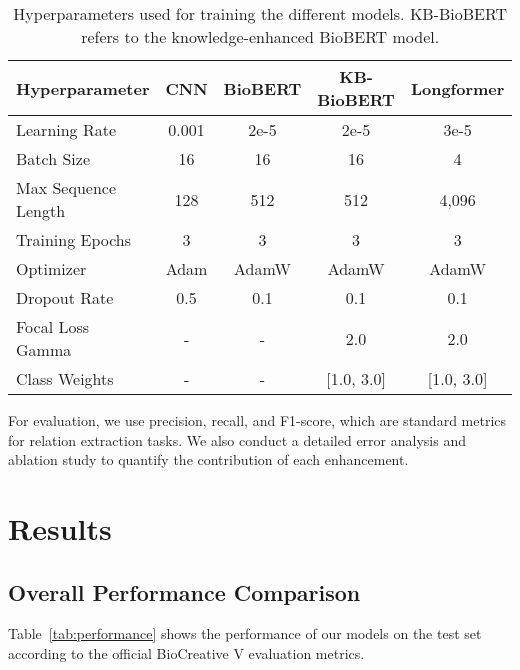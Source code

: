\documentclass{amia}
\begin{document}
\begin{table}[H]
\begin{center}
\begin{tabular}{|l|c|c|c|c|}
\hline
\textbf{Hyperparameter} & \textbf{CNN} & \textbf{BioBERT} & \textbf{KB-BioBERT} & \textbf{Longformer} \\
\hline
Learning Rate & 0.001 & 2e-5 & 2e-5 & 3e-5 \\
\hline
Batch Size & 16 & 16 & 16 & 4 \\
\hline
Max Sequence Length & 128 & 512 & 512 & 4,096 \\
\hline
Training Epochs & 3 & 3 & 3 & 3 \\
\hline
Optimizer & Adam & AdamW & AdamW & AdamW \\
\hline
Dropout Rate & 0.5 & 0.1 & 0.1 & 0.1 \\
\hline
Focal Loss Gamma & - & - & 2.0 & 2.0 \\
\hline
Class Weights & - & - & [1.0, 3.0] & [1.0, 3.0] \\
\hline
\end{tabular}
\end{center}
\caption{Hyperparameters used for training the different models. KB-BioBERT refers to the knowledge-enhanced BioBERT model.}
\label{tab:hyperparams}
\end{table}

For evaluation, we use precision, recall, and F1-score, which are standard metrics for relation extraction tasks. We also conduct a detailed error analysis and ablation study to quantify the contribution of each enhancement.

\section*{Results}

\subsection*{Overall Performance Comparison}

Table~\ref{tab:performance} shows the performance of our models on the test set according to the official BioCreative V evaluation metrics.
\end{document}
